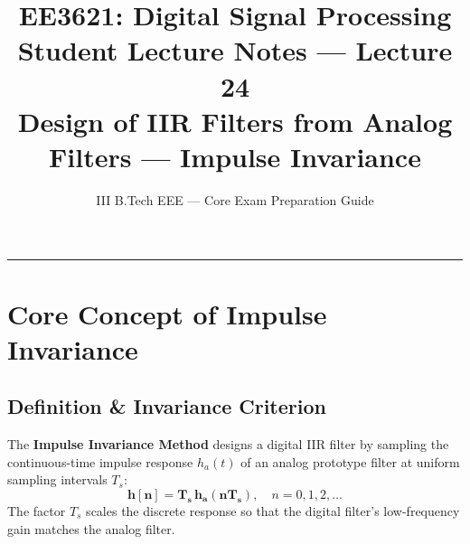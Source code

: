 \documentclass[11pt,a4paper]{article}
\title{\textbf{EE3621: Digital Signal Processing} \\ \Large Student Lecture Notes — Lecture 24 \\ \large Design of IIR Filters from Analog Filters — Impulse Invariance}
\author{III B.Tech EEE — Core Exam Preparation Guide}
\date{}
\begin{document}
\maketitle

\noindent\rule{\textwidth}{0.5pt}

\section{Core Concept of Impulse Invariance}

\subsection{Definition \& Invariance Criterion}
The \textbf{Impulse Invariance Method} designs a digital IIR filter by sampling the continuous-time impulse response $h_a(t)$ of an analog prototype filter at uniform sampling intervals $T_s$:
\begin{equation}
\mathbf{h[n] = T_s \, h_a(n T_s)}, \quad n = 0, 1, 2, \dots
\end{equation}
The factor $T_s$ scales the discrete response so that the digital filter's low-frequency gain matches the analog filter.
\end{document}
